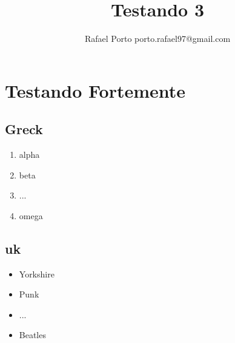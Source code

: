 \documentclass[12pt]{utfpr-pg}
\title{Testando 3}
\author{Rafael Porto porto.rafael97@gmail.com}
\begin{document}
\maketitle

\chapter{Testando Fortemente}

\section{Greck}

\begin{enumerate}
\item alpha 
\item beta
\item ...
\item omega
\end{enumerate}

\section{uk}

\begin{itemize}
\item Yorkshire
\item Punk
\item ...
\item Beatles
\end{itemize}
\end{document}
